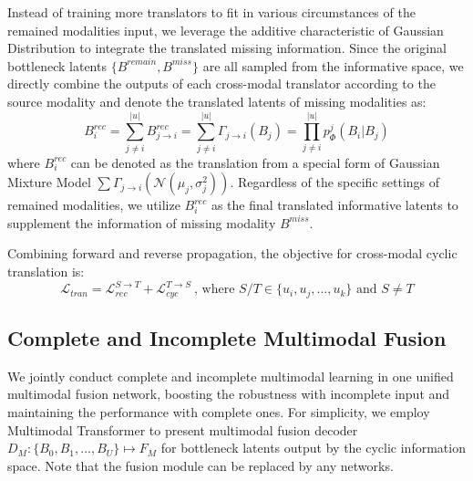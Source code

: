 \documentclass{article}
\begin{document}
Instead of training more translators to fit in various circumstances of the remained modalities input, we leverage the additive characteristic of Gaussian Distribution to integrate the translated missing information. Since the original bottleneck latents $\{B^{remain}, B^{miss}\}$ are all sampled from the informative space, we directly combine the outputs of each  cross-modal translator according to the source modality and denote the translated latents of missing modalities as:
\begin{equation}
    B_{i}^{rec}=\sum^{|u|}_{j\neq i} B_{j\rightarrow i}^{rec}=\sum^{|u|}_{j\neq i} \Gamma_{j\rightarrow i}(B_j) = \prod^{|u|}_{j\neq i} p_\Phi^j(B_i|B_j)
\end{equation}
where $B_{i}^{rec}$ can be denoted as the translation from a special form of Gaussian Mixture Model $\sum \Gamma_{j\rightarrow i}(\mathcal{N}(\mu_j,\sigma^2_j))$. Regardless of the specific settings of remained modalities, we utilize $B_{i}^{rec}$ as the final translated informative latents to supplement the information of missing modality $B^{miss}$.


Combining forward and reverse propagation, the objective for cross-modal cyclic translation is:
\begin{equation}
    \mathcal{L}_{tran} = \mathcal{L}^{S\rightarrow T}_{rec} + \mathcal{L}^{T\rightarrow S}_{cyc}\ \text{, where } S/T\in\{u_i,u_j,...,u_k\} \text{ and } S\neq T
\label{equ_translation}
\end{equation}

\subsection{Complete and Incomplete Multimodal Fusion}
We jointly conduct complete and incomplete multimodal learning in one unified multimodal fusion network, boosting the robustness with incomplete input and maintaining the performance with complete ones. For simplicity, we employ Multimodal Transformer \cite{tsai2019multimodal} to present multimodal fusion decoder $D_M:\{B_0,B_1,...,B_U\}\mapsto F_M$ for bottleneck latents output by the cyclic information space. Note that the fusion module can be replaced by any networks.
\end{document}
